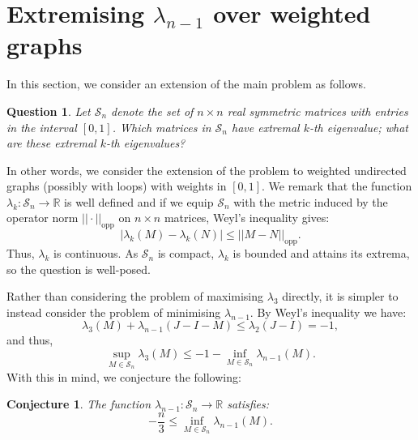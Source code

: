 \documentclass[12pt]{article}
\newtheorem{qun}[thm]{Question}
\newtheorem{conj}[thm]{Conjecture}
\begin{document}
\section{Extremising $\lambda_{n-1}$ over weighted graphs}\label{sec:weighted}
In this section, we consider an extension of the main problem as follows.
\begin{qun} \label{qun:weighted} Let $\mathcal{S}_n$ denote the set of $n\times n$ real symmetric matrices with entries in the interval $[0,1]$. Which matrices in $\mathcal{S}_n$ have extremal $k$-th eigenvalue; what are these extremal $k$-th eigenvalues?
\end{qun}
In other words, we consider the extension of the problem to weighted undirected graphs (possibly with loops) with weights in $[0,1]$. We remark that the function $\lambda_{k}:\mathcal{S}_n\to \mathbb{R}$ is well defined and if we equip $\mathcal{S}_n$ with the metric induced by the operator norm $|| \cdot||_{\text{opp}}$ on $n\times n$ matrices, Weyl's inequality gives:
\begin{equation*}
    |\lambda_{k}(M) - \lambda_{k}(N)| \le ||M-N||_{\text{opp}}.
\end{equation*}
Thus, $\lambda_k$ is continuous. As $\mathcal{S}_n$ is compact, $\lambda_k$ is bounded and attains its extrema, so the question is well-posed. 

Rather than considering the problem of maximising $\lambda_3$ directly, it is simpler to instead consider the problem of minimising $\lambda_{n-1}$. By Weyl's inequality we have:
\begin{equation*}
    \lambda_3(M) + \lambda_{n-1}(J-I-M) \le \lambda_{2}(J-I)=-1,
\end{equation*}
and thus,
\begin{equation*}
    \sup_{M\in \mathcal{S}_n} \lambda_3(M) \le -1 - \inf_{M\in \mathcal{S}_n} \lambda_{n-1}(M).
\end{equation*}
With this in mind, we conjecture the following:
\begin{conj} \label{conj:weighted} The function $\lambda_{n-1}: \mathcal{S}_n\to \mathbb{R}$ satisfies:
\begin{equation*}
    -\frac{n}{3} \le \inf_{M\in \mathcal{S}_n} \lambda_{n-1}(M).
\end{equation*}
\end{conj}
\end{document}
